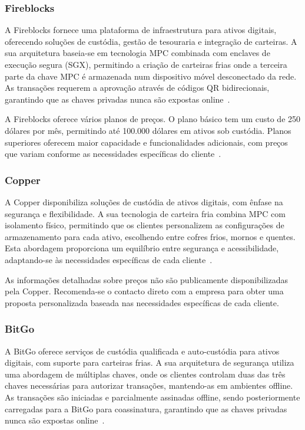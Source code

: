 \subsubsection{Fireblocks}
A Fireblocks fornece uma plataforma de infraestrutura para ativos digitais, oferecendo soluções de custódia, gestão de tesouraria e integração de carteiras. A sua arquitetura baseia-se em tecnologia MPC combinada com enclaves de execução segura (SGX), permitindo a criação de carteiras frias onde a terceira parte da chave MPC é armazenada num dispositivo móvel desconectado da rede. As transações requerem a aprovação através de códigos QR bidirecionais, garantindo que as chaves privadas nunca são expostas online~\cite{fireblocks2023, fireblocksdocs2023}.

A Fireblocks oferece vários planos de preços. O plano básico tem um custo de 250 dólares por mês, permitindo até 100.000 dólares em ativos sob custódia. Planos superiores oferecem maior capacidade e funcionalidades adicionais, com preços que variam conforme as necessidades específicas do cliente~\cite{fireblockspricing2023}.

\subsubsection{Copper}
A Copper disponibiliza soluções de custódia de ativos digitais, com ênfase na segurança e flexibilidade. A sua tecnologia de carteira fria combina MPC com isolamento físico, permitindo que os clientes personalizem as configurações de armazenamento para cada ativo, escolhendo entre cofres frios, mornos e quentes. Esta abordagem proporciona um equilíbrio entre segurança e acessibilidade, adaptando-se às necessidades específicas de cada cliente~\cite{copper2023, coppercustody2023}.

As informações detalhadas sobre preços não são publicamente disponibilizadas pela Copper. Recomenda-se o contacto direto com a empresa para obter uma proposta personalizada baseada nas necessidades específicas de cada cliente.

\subsubsection{BitGo}
A BitGo oferece serviços de custódia qualificada e auto-custódia para ativos digitais, com suporte para carteiras frias. A sua arquitetura de segurança utiliza uma abordagem de múltiplas chaves, onde os clientes controlam duas das três chaves necessárias para autorizar transações, mantendo-as em ambientes offline. As transações são iniciadas e parcialmente assinadas offline, sendo posteriormente carregadas para a BitGo para coassinatura, garantindo que as chaves privadas nunca são expostas online~\cite{bitgo2023, bitgocold2023}.

